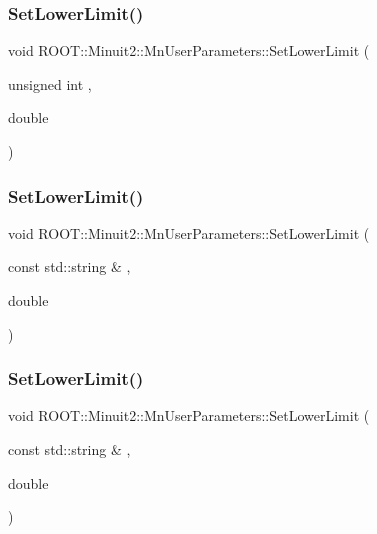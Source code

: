 \subsubsection{\texorpdfstring{SetLowerLimit()}{SetLowerLimit()}\hspace{0.1cm}{\footnotesize\ttfamily [3/6]}}
{\footnotesize\ttfamily void R\+O\+O\+T\+::\+Minuit2\+::\+Mn\+User\+Parameters\+::\+Set\+Lower\+Limit (\begin{DoxyParamCaption}\item[{unsigned int}]{,  }\item[{double}]{ }\end{DoxyParamCaption})}

\mbox{\label{classROOT_1_1Minuit2_1_1MnUserParameters_a3423d925b9a4b455c6130fa19f66adb4}} 
\subsubsection{\texorpdfstring{SetLowerLimit()}{SetLowerLimit()}\hspace{0.1cm}{\footnotesize\ttfamily [4/6]}}
{\footnotesize\ttfamily void R\+O\+O\+T\+::\+Minuit2\+::\+Mn\+User\+Parameters\+::\+Set\+Lower\+Limit (\begin{DoxyParamCaption}\item[{const std\+::string \&}]{,  }\item[{double}]{ }\end{DoxyParamCaption})}

\mbox{\label{classROOT_1_1Minuit2_1_1MnUserParameters_a3423d925b9a4b455c6130fa19f66adb4}} 
\subsubsection{\texorpdfstring{SetLowerLimit()}{SetLowerLimit()}\hspace{0.1cm}{\footnotesize\ttfamily [5/6]}}
{\footnotesize\ttfamily void R\+O\+O\+T\+::\+Minuit2\+::\+Mn\+User\+Parameters\+::\+Set\+Lower\+Limit (\begin{DoxyParamCaption}\item[{const std\+::string \&}]{,  }\item[{double}]{ }\end{DoxyParamCaption})}


